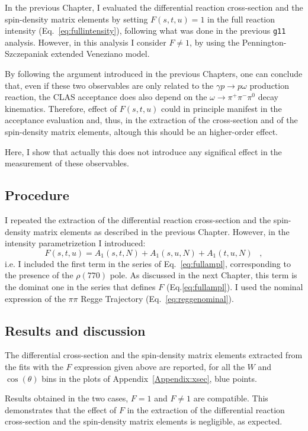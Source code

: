 \documentclass[a4paper,10pt]{report}
\newcommand{\decay}{$\omega \rightarrow \pi^+ \pi^- \pi^0$ }
\newcommand{\production}{$\gamma p \rightarrow p \omega$ }
\begin{document}
In the previous Chapter, I evaluated the differential reaction cross-section and the spin-density matrix elements by setting $F(s,t,u)=1$ in the full reaction intensity (Eq.~\ref{eq:fullintensity}), following what was done in the previous \texttt{g11} analysis. 
However, in this analysis I consider $F \neq 1$, by using the Pennington-Szczepaniak extended Veneziano model.

By following the argument introduced in the previous Chapters, one can conclude that, even if these two observables are only related to the \production production reaction, the CLAS acceptance does also depend on the \decay decay kinematics. 
Therefore, effect of $F(s,t,u)$ could in principle manifest in the acceptance evaluation and, thus, in the extraction of the cross-section and of the spin-density matrix elements, altough this should be an higher-order effect.

Here, I show that actually this does not introduce any significal effect in the measurement of these observables.

\subsection{Procedure}

I repeated the extraction of the differential reaction cross-section and the spin-density matrix elements as described in the previous Chapter.
However, in the intensity parametrizetion I introduced:
\begin{equation}
F(s,t,u)=A_1(s,t,N)+A_1(s,u,N)+A_1(t,u,N) \; \; \; ,
\end{equation}
i.e. I included the first term in the series of Eq.~\ref{eq:fullampl}, corresponding to the presence of the $\rho(770)$ pole. As discussed in the next Chapter, this term is the dominat one in the series that defines $F$ (Eq.\ref{eq:fullampl}).
I used the nominal expression of the $\pi \pi$ Regge Trajectory (Eq.~\ref{eq:reggenominal}).
\subsection{Results and discussion}

The differential cross-section and the spin-density matrix elements extracted from the fits with the $F$ expression given above are reported, for all the $W$ and $\cos(\theta)$ bins in the plots of Appendix~\ref{Appendix:xsec}, blue points.

Results obtained in the two cases, $F=1$ and $F\neq 1$ are compatible. This demonstrates that the effect of $F$ in the extraction of the differential reaction cross-section and the spin-density matrix elements is negligible, as expected.
\end{document}
